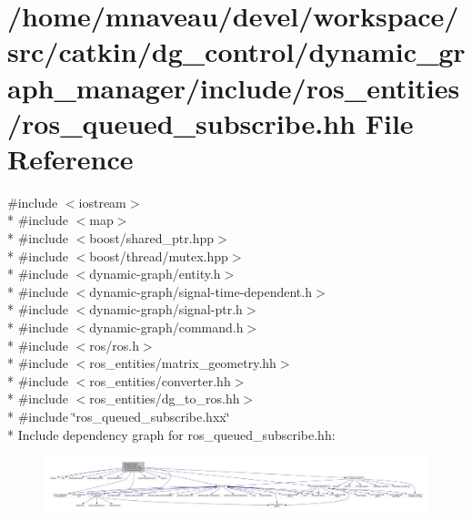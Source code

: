 \hypertarget{ros__queued__subscribe_8hh}{}\section{/home/mnaveau/devel/workspace/src/catkin/dg\+\_\+control/dynamic\+\_\+graph\+\_\+manager/include/ros\+\_\+entities/ros\+\_\+queued\+\_\+subscribe.hh File Reference}
\label{ros__queued__subscribe_8hh}
{\ttfamily \#include $<$iostream$>$}\\*
{\ttfamily \#include $<$map$>$}\\*
{\ttfamily \#include $<$boost/shared\+\_\+ptr.\+hpp$>$}\\*
{\ttfamily \#include $<$boost/thread/mutex.\+hpp$>$}\\*
{\ttfamily \#include $<$dynamic-\/graph/entity.\+h$>$}\\*
{\ttfamily \#include $<$dynamic-\/graph/signal-\/time-\/dependent.\+h$>$}\\*
{\ttfamily \#include $<$dynamic-\/graph/signal-\/ptr.\+h$>$}\\*
{\ttfamily \#include $<$dynamic-\/graph/command.\+h$>$}\\*
{\ttfamily \#include $<$ros/ros.\+h$>$}\\*
{\ttfamily \#include $<$ros\+\_\+entities/matrix\+\_\+geometry.\+hh$>$}\\*
{\ttfamily \#include $<$ros\+\_\+entities/converter.\+hh$>$}\\*
{\ttfamily \#include $<$ros\+\_\+entities/dg\+\_\+to\+\_\+ros.\+hh$>$}\\*
{\ttfamily \#include \char`\"{}ros\+\_\+queued\+\_\+subscribe.\+hxx\char`\"{}}\\*
Include dependency graph for ros\+\_\+queued\+\_\+subscribe.\+hh\+:\nopagebreak
\begin{figure}[H]
\begin{center}
\leavevmode
\includegraphics[width=350pt]{ros__queued__subscribe_8hh__incl}
\end{center}
\end{figure}
